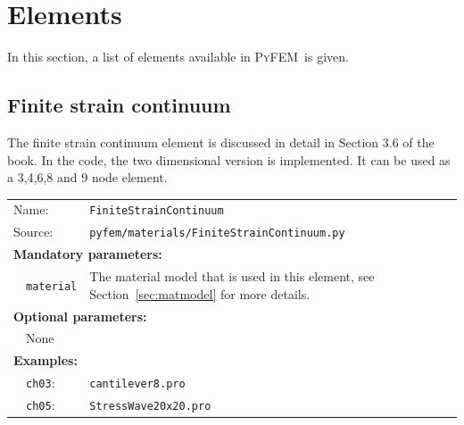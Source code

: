 \documentclass{article}
\newcommand{\progname}{\textsc{PyFEM}}
\begin{document}

\section{Elements}\label{sec:elements}

In this section, a list of elements available in \progname~is given.

\subsection{Finite strain continuum}

The finite strain continuum element is discussed in detail in Section 3.6 of the book. In the code, the two dimensional
version is implemented. It can be used as a 3,4,6,8 and 9 node element.

\vspace{2mm}
\begin{tabular}{p{22mm}p{74mm}}
Name:         & \texttt{FiniteStrainContinuum} \\
Source:  & \texttt{pyfem/materials/FiniteStrainContinuum.py} \\
\multicolumn{2}{l}{\textbf{Mandatory parameters:}} \\
~~\texttt{material} & The material model that is used in this element, see Section~\ref{sec:matmodel} for more details.\\
\multicolumn{2}{l}{\textbf{Optional parameters:}} \\ 
~~None  & \\
\multicolumn{2}{l}{\textbf{Examples:}}\\
~~\texttt{ch03}: & \texttt{cantilever8.pro}\\
~~\texttt{ch05}: & \texttt{StressWave20x20.pro}
\end{tabular}
\end{document}
